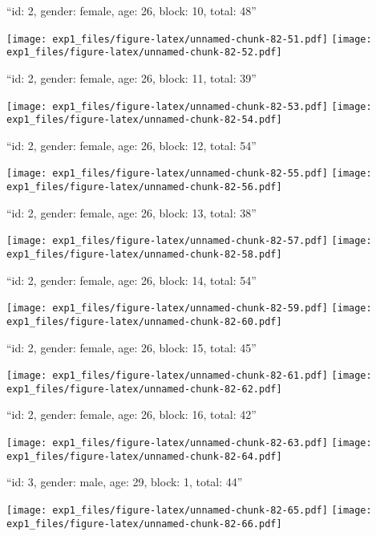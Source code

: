 \documentclass[11pt,,]{article}
\begin{document}
``id: 2, gender: female, age: 26, block: 10, total: 48''

\texttt{[image: exp1\_files/figure-latex/unnamed-chunk-82-51.pdf]}
\texttt{[image: exp1\_files/figure-latex/unnamed-chunk-82-52.pdf]}

\newpage
[1] 

``id: 2, gender: female, age: 26, block: 11, total: 39''

\texttt{[image: exp1\_files/figure-latex/unnamed-chunk-82-53.pdf]}
\texttt{[image: exp1\_files/figure-latex/unnamed-chunk-82-54.pdf]}

\newpage
[1] 

``id: 2, gender: female, age: 26, block: 12, total: 54''

\texttt{[image: exp1\_files/figure-latex/unnamed-chunk-82-55.pdf]}
\texttt{[image: exp1\_files/figure-latex/unnamed-chunk-82-56.pdf]}

\newpage
[1] 

``id: 2, gender: female, age: 26, block: 13, total: 38''

\texttt{[image: exp1\_files/figure-latex/unnamed-chunk-82-57.pdf]}
\texttt{[image: exp1\_files/figure-latex/unnamed-chunk-82-58.pdf]}

\newpage
[1] 

``id: 2, gender: female, age: 26, block: 14, total: 54''

\texttt{[image: exp1\_files/figure-latex/unnamed-chunk-82-59.pdf]}
\texttt{[image: exp1\_files/figure-latex/unnamed-chunk-82-60.pdf]}

\newpage
[1] 

``id: 2, gender: female, age: 26, block: 15, total: 45''

\texttt{[image: exp1\_files/figure-latex/unnamed-chunk-82-61.pdf]}
\texttt{[image: exp1\_files/figure-latex/unnamed-chunk-82-62.pdf]}

\newpage
[1] 

``id: 2, gender: female, age: 26, block: 16, total: 42''

\texttt{[image: exp1\_files/figure-latex/unnamed-chunk-82-63.pdf]}
\texttt{[image: exp1\_files/figure-latex/unnamed-chunk-82-64.pdf]}

\newpage
[1] 

``id: 3, gender: male, age: 29, block: 1, total: 44''

\texttt{[image: exp1\_files/figure-latex/unnamed-chunk-82-65.pdf]}
\texttt{[image: exp1\_files/figure-latex/unnamed-chunk-82-66.pdf]}

\newpage
[1] 
\end{document}
